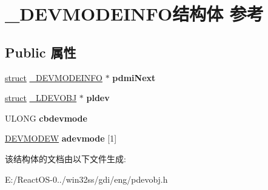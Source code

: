 \hypertarget{struct___d_e_v_m_o_d_e_i_n_f_o}{}\section{\+\_\+\+D\+E\+V\+M\+O\+D\+E\+I\+N\+F\+O结构体 参考}
\label{struct___d_e_v_m_o_d_e_i_n_f_o}
\subsection*{Public 属性}
\begin{DoxyCompactItemize}
\item 
\mbox{\label{struct___d_e_v_m_o_d_e_i_n_f_o_a35ddbf6178395e730137e3ca091fa2cf}} 
\hyperlink{interfacestruct}{struct} \hyperlink{struct___d_e_v_m_o_d_e_i_n_f_o}{\+\_\+\+D\+E\+V\+M\+O\+D\+E\+I\+N\+FO} $\ast$ {\bfseries pdmi\+Next}
\item 
\mbox{\label{struct___d_e_v_m_o_d_e_i_n_f_o_a3958705c077eda5bc253117b9c898f1f}} 
\hyperlink{interfacestruct}{struct} \hyperlink{struct___l_d_e_v_o_b_j}{\+\_\+\+L\+D\+E\+V\+O\+BJ} $\ast$ {\bfseries pldev}
\item 
\mbox{\label{struct___d_e_v_m_o_d_e_i_n_f_o_abb4ebac85fa551ba6e2a409ae9f27978}} 
U\+L\+O\+NG {\bfseries cbdevmode}
\item 
\mbox{\label{struct___d_e_v_m_o_d_e_i_n_f_o_a85fff6c5b5e58b27ea6f1c60b8793bf9}} 
\hyperlink{struct__devicemode_w}{D\+E\+V\+M\+O\+D\+EW} {\bfseries adevmode} \mbox{[}1\mbox{]}
\end{DoxyCompactItemize}


该结构体的文档由以下文件生成\+:\begin{DoxyCompactItemize}
\item 
E\+:/\+React\+O\+S-\/0../win32ss/gdi/eng/pdevobj.\+h\end{DoxyCompactItemize}
